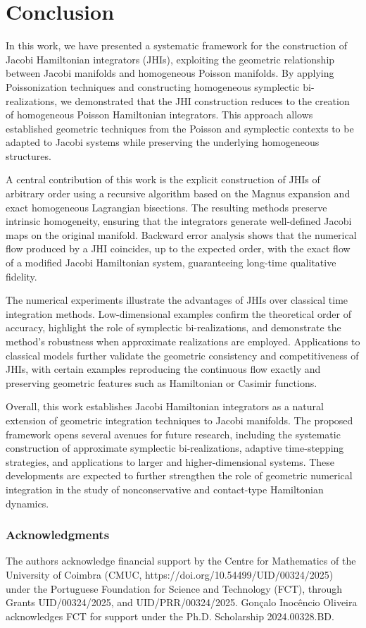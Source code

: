 \documentclass[12pt,english]{article}
\begin{document}
\section{Conclusion}

In this work, we have presented a systematic framework for the construction of Jacobi Hamiltonian integrators (JHIs), exploiting the geometric relationship between Jacobi manifolds and homogeneous Poisson manifolds. By applying Poissonization techniques and constructing homogeneous symplectic bi-realizations, we demonstrated that the JHI construction reduces to the creation of homogeneous Poisson Hamiltonian integrators. This approach allows established geometric techniques from the Poisson and symplectic contexts to be adapted to Jacobi systems while preserving the underlying homogeneous structures.

A central contribution of this work is the explicit construction of JHIs of arbitrary order using a recursive algorithm based on the Magnus expansion and exact homogeneous Lagrangian bisections. The resulting methods preserve intrinsic homogeneity, ensuring that the integrators generate well-defined Jacobi maps on the original manifold. Backward error analysis shows that the numerical flow produced by a JHI coincides, up to the expected order, with the exact flow of a modified Jacobi Hamiltonian system, guaranteeing long-time qualitative fidelity.

The numerical experiments illustrate the advantages of JHIs over classical time integration methods. Low-dimensional examples confirm the theoretical order of accuracy, highlight the role of symplectic bi-realizations, and demonstrate the method's robustness when approximate realizations are employed. Applications to classical models further validate the geometric consistency and competitiveness of JHIs, with certain examples reproducing the continuous flow exactly and preserving geometric features such as Hamiltonian or Casimir functions.

Overall, this work establishes Jacobi Hamiltonian integrators as a natural extension of geometric integration techniques to Jacobi manifolds. The proposed framework opens several avenues for future research, including the systematic construction of approximate symplectic bi-realizations, adaptive time-stepping strategies, and applications to larger and higher-dimensional systems. These developments are expected to further strengthen the role of geometric numerical integration in the study of nonconservative and contact-type Hamiltonian dynamics.



\subsubsection*{Acknowledgments} The authors acknowledge financial support by the Centre for Mathematics of the University of Coimbra (CMUC, https://doi.org/10.54499/UID/00324/2025) under the Portuguese Foundation for Science and Technology (FCT), through Grants UID/00324/2025, and UID/PRR/00324/2025. Gon\c calo Inoc\^encio Oliveira acknowledges FCT for support under the Ph.D.
Scholarship 2024.00328.BD.



\newpage


\end{document}
